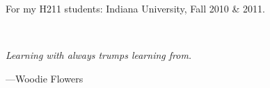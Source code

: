 \newpage


\begin{center}

For my H211 students: Indiana University, Fall 2010 \& 2011.
\end{center}
\ \\
\begin{flushright}
\textit{Learning with always trumps learning from.}
\vspace{0.5cm}

---Woodie Flowers

\end{flushright}


